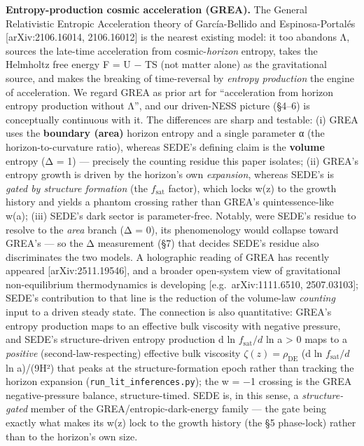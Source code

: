 \documentclass[
  10pt,
]{article}
\begin{document}
\textbf{Entropy-production cosmic acceleration (GREA).} The General
Relativistic Entropic Acceleration theory of García-Bellido and
Espinosa-Portalés {[}arXiv:2106.16014, 2106.16012{]} is the nearest
existing model: it too abandons Λ, sources the late-time acceleration
from cosmic-\emph{horizon} entropy, takes the Helmholtz free energy F =
U − TS (not matter alone) as the gravitational source, and makes the
breaking of time-reversal by \emph{entropy production} the engine of
acceleration. We regard GREA as prior art for ``acceleration from
horizon entropy production without Λ'', and our driven-NESS picture
(§4--6) is conceptually continuous with it. The differences are sharp
and testable: (i) GREA uses the \textbf{boundary (area)} horizon entropy
and a single parameter α (the horizon-to-curvature ratio), whereas
SEDE's defining claim is the \textbf{volume} entropy (Δ = 1) ---
precisely the counting residue this paper isolates; (ii) GREA's entropy
growth is driven by the horizon's own \emph{expansion}, whereas SEDE's
is \emph{gated by structure formation} (the \(f_{\mathrm{sat}}\)
factor), which locks w(z) to the growth history and yields a phantom
crossing rather than GREA's quintessence-like w(a); (iii) SEDE's dark
sector is parameter-free. Notably, were SEDE's residue to resolve to the
\emph{area} branch (Δ = 0), its phenomenology would collapse toward
GREA's --- so the Δ measurement (§7) that decides SEDE's residue also
discriminates the two models. A holographic reading of GREA has recently
appeared {[}arXiv:2511.19546{]}, and a broader open-system view of
gravitational non-equilibrium thermodynamics is developing
{[}e.g.~arXiv:1111.6510, 2507.03103{]}; SEDE's contribution to that line
is the reduction of the volume-law \emph{counting} input to a driven
steady state. The connection is also quantitative: GREA's entropy
production maps to an effective bulk viscosity with negative pressure,
and SEDE's structure-driven entropy production d ln
\(f_{\mathrm{sat}}/d\) ln a \textgreater{} 0 maps to a \emph{positive}
(second-law-respecting) effective bulk viscosity
\(\zeta (z) = \rho _{\mathrm{DE}}\) (d ln \(f_{\mathrm{sat}}/d\) ln
a)/(9H²) that peaks at the structure-formation epoch rather than
tracking the horizon expansion (\texttt{run\_lit\_inferences.py}); the w
= −1 crossing is the GREA negative-pressure balance, structure-timed.
SEDE is, in this sense, a \emph{structure-gated} member of the
GREA/entropic-dark-energy family --- the gate being exactly what makes
its w(z) lock to the growth history (the §5 phase-lock) rather than to
the horizon's own size.
\end{document}
